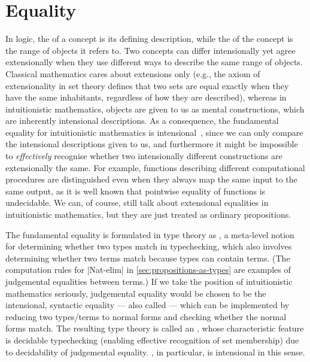 \section{Equality}
\label{sec:equality}

In logic, the  of a concept is its defining description, while the  of the concept is the range of objects it refers to.
Two concepts can differ intensionally yet agree extensionally when they use different ways to describe the same range of objects.
Classical mathematics cares about extensions only (e.g., the axiom of extensionality in set theory defines that two sets are equal exactly when they have the same inhabitants, regardless of how they are described), whereas in intuitionistic mathematics, objects are given to us as mental constructions, which are inherently intensional descriptions.
As a consequence, the fundamental equality for intuitionistic mathematics is intensional~\citep[Section~1.2]{Dummett-intuitionism}, since we can only compare the intensional descriptions given to us, and furthermore it might be impossible to \emph{effectively} recognise whether two intensionally different constructions are extensionally the same.
For example, functions describing different computational procedures are distinguished even when they always map the same input to the same output, as it is well known that pointwise equality of functions is undecidable.
We can, of course, still talk about extensional equalities in intuitionistic mathematics, but they are just treated as ordinary propositions.

The fundamental equality is formulated in type theory as , a meta-level notion for determining whether two types match in typechecking, which also involves determining whether two terms match because types can contain terms.
(The computation rules for |Nat-elim| in \autoref{sec:propositions-as-types} are examples of judgemental equalities between terms.)
If we take the position of intuitionistic mathematics seriously, judgemental equality would be chosen to be the intensional, syntactic equality --- also called  --- which can be implemented by reducing two types/terms to normal forms and checking whether the normal forms match.
The resulting type theory is called an , whose characteristic feature is decidable typechecking (enabling effective recognition of set membership) due to decidability of judgemental equality.
\Agda, in particular, is intensional in this sense.

